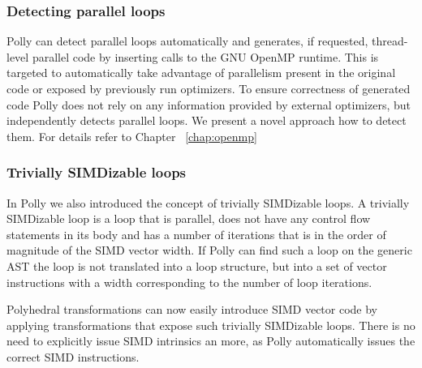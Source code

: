 \subsubsection{Detecting parallel loops}
Polly can detect parallel loops automatically and generates, if requested,
thread-level parallel code by inserting calls to the GNU OpenMP runtime. This
is targeted to automatically take advantage of parallelism present in the
original code or exposed by previously run optimizers. To ensure correctness of
generated code Polly does not rely on any information provided by external
optimizers, but independently detects parallel loops. We present a novel
approach how to detect them. For details refer to Chapter ~\ref{chap:openmp}


\subsubsection{Trivially SIMDizable loops}
In Polly we also introduced the concept of trivially SIMDizable loops. A
trivially SIMDizable loop is a loop that is parallel, does not have any control
flow statements in its body and has a number of iterations that is in the order of
magnitude of the SIMD vector width. If Polly can find such a loop on the generic AST
the loop is not translated into a loop structure, but into a set of vector
instructions with a width corresponding to the number of loop iterations.

Polyhedral transformations can now easily introduce SIMD vector code by applying
transformations that expose such trivially SIMDizable loops. There is no need
to explicitly issue SIMD intrinsics an more, as Polly automatically issues the
correct SIMD instructions.

